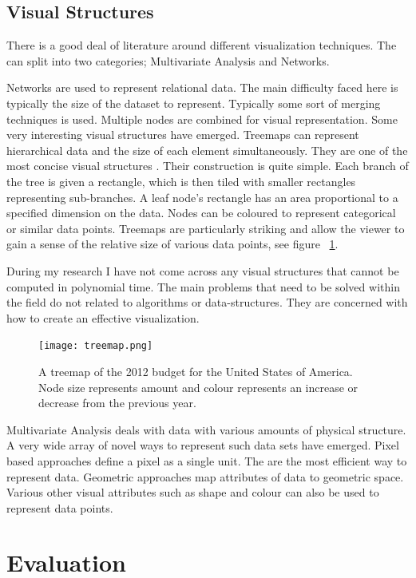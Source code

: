 \documentclass[a4paper, 10pt, titlepage, twocolumn]{article}
\begin{document}
\subsection{Visual Structures}
There is a good deal of literature around different visualization techniques. The can split into two categories; Multivariate Analysis and Networks.

Networks are used to represent relational data. The main difficulty faced here is typically the size of the dataset to represent. Typically some sort of merging techniques is used. Multiple nodes are combined for visual representation. Some very interesting visual structures have emerged. Treemaps can represent hierarchical data and the size of each element simultaneously. They are one of the most concise visual structures \cite{shneiderman2001ordered}. Their construction is quite simple. Each branch of the tree is given a rectangle, which is then tiled with smaller rectangles representing sub-branches. A leaf node's rectangle has an area proportional to a specified dimension on the data. Nodes can be coloured to represent categorical or similar data points. Treemaps are particularly striking and allow the viewer to gain a sense of the relative size of various data points, see figure ~\ref{fig:treemap}. 

During my research I have not come across any visual structures that cannot be computed in polynomial time. The main problems that need to be solved within the field do not related to algorithms or data-structures. They are concerned with how to create an effective visualization.

\begin{figure}[hbt]
  \begin{center}
    \texttt{[image: treemap.png]}
  \end{center}
  \caption{\small A treemap of the 2012 budget for the United States of America. Node size represents amount and colour represents an increase or decrease from the previous year.}
  \label{fig:treemap}
\end{figure}

Multivariate Analysis deals with data with various amounts of physical structure. A very wide array of novel ways to represent such data sets have emerged. Pixel based approaches define a pixel as a single unit. The are the most efficient way to represent data. Geometric approaches map attributes of data to geometric space. Various other visual attributes such as shape and colour can also be used to represent data points.

\section{Evaluation}

\newpage


 


 
\end{document}
